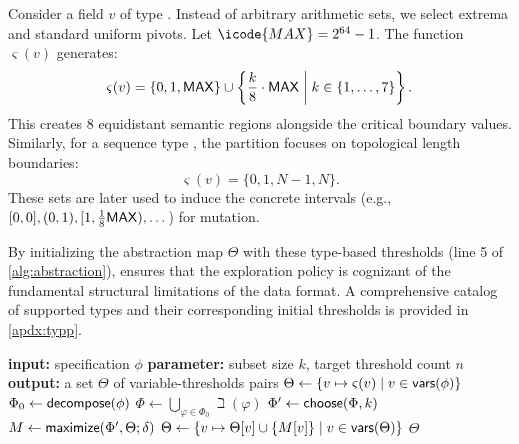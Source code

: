 \begin{example}
Consider a field $v$ of type . Instead of arbitrary arithmetic sets, we select extrema and standard uniform pivots. Let $\icode{MAX} = 2^{64}-1$. The function $\varsigma(v)$ generates:
\[
\varsigma(v) = \{ 0, 1, {\sf MAX} \} \cup \left\{ \frac{k}{8} \cdot {\sf MAX} \;\middle|\; k \in \{1, \dots, 7\} \right\}.
\]
This creates 8 equidistant semantic regions alongside the critical boundary values. Similarly, for a sequence type , the partition focuses on topological length boundaries:
\[ \varsigma(v) = \{ 0, 1, N-1, N \}. \]
These sets are later used to induce the concrete intervals (e.g., $[0, 0], (0, 1), [1, \frac{1}{8}{\sf MAX}), \dots$) for mutation.
\end{example}

By initializing the abstraction map $\Theta$ with these type-based thresholds (line 5 of \autoref{alg:abstraction}), \tool ensures that the exploration policy is cognizant of the fundamental structural limitations of the data format. A comprehensive catalog of supported types and their corresponding initial thresholds is provided in \autoref{apdx:typp}.

\begin{algorithm}[t]
    \caption{Specification-Guided Abstraction}
    \begin{algorithmic}[1]
            \State \textbf{input:} specification $\phi$
            \State \textbf{parameter:} subset size $k$, target threshold count $n$
            \State \textbf{output:} a set $\Theta$ of variable-thresholds pairs
            \State $\Theta \gets \{ v \mapsto \varsigma(v) \mid v \in {\sf vars}(\phi) \}$ 
            \State $\Phi_0 \gets {\sf decompose}(\phi)$ 
            \State $\Phi \gets \bigcup_{\varphi \in \Phi_0} \beth(\varphi) $ 
                \State $\Phi' \gets {\sf choose}(\Phi, k)$ 
                \State $M \gets {\sf maximize}(\Phi', \Theta; \delta)$ 
                 
                    \State $\Theta \gets \{ v \mapsto \Theta[v] \cup \{ M[v] \} \mid v \in {\sf vars}(\Theta) \}$ 
                \EndIf
            \EndWhile
            \State \Return $\Theta$
        \EndProcedure
    \end{algorithmic}
    \label{alg:abstraction}
\end{algorithm}

